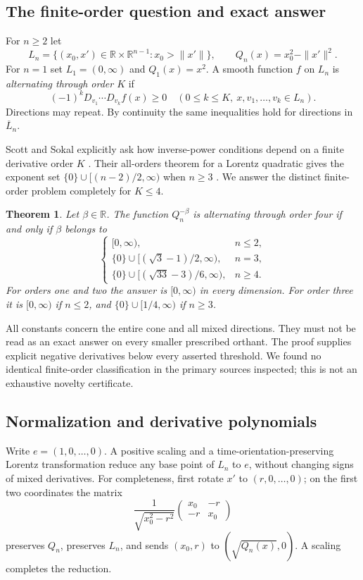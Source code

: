 \documentclass[11pt,a4paper]{article}
\newtheorem{theorem}{Theorem}[section]
\theoremstyle{definition}\newtheorem{definition}[theorem]{Definition}
\theoremstyle{remark}\newtheorem{remark}[theorem]{Remark}
\newcommand{\R}{\mathbb R}\newcommand{\C}{\mathbb C}\newcommand{\N}{\mathbb N}
\numberwithin{equation}{section}
\begin{document}
\subsection{The finite-order question and exact answer}\label{S06-sec-1}
For $n\ge2$ let
\[
 L_n=\{(x_0,x')\in\R\times\R^{n-1}:x_0>\|x'\|\},\qquad
 Q_n(x)=x_0^2-\|x'\|^2.
\]
For $n=1$ set $L_1=(0,\infty)$ and $Q_1(x)=x^2$. A smooth function $f$ on $L_n$ is \emph{alternating through order $K$} if
\begin{equation}\label{S06-alt}
 (-1)^kD_{v_1}\cdots D_{v_k}f(x)\ge0
 \quad(0\le k\le K,\ x,v_1,\ldots,v_k\in L_n).
\end{equation}
Directions may repeat. By continuity the same inequalities hold for directions in $\overline L_n$.

Scott and Sokal explicitly ask how inverse-power conditions depend on a finite derivative order $K$ \cite[Section 1.5]{ref005}. Their all-orders theorem for a Lorentz quadratic gives the exponent set $\{0\}\cup[(n-2)/2,\infty)$ when $n\ge3$ \cite[Theorem 1.9]{ref005}. We answer the distinct finite-order problem completely for $K\le4$.
\begin{theorem}\label{S06-main}
Let $\beta\in\R$. The function $Q_n^{-\beta}$ is alternating through order four if and only if $\beta$ belongs to
\[
\begin{cases}
[0,\infty),&n\le2,\\
\{0\}\cup[(\sqrt3-1)/2,\infty),&n=3,\\
\{0\}\cup[(\sqrt{33}-3)/6,\infty),&n\ge4.
\end{cases}
\]
For orders one and two the answer is $[0,\infty)$ in every dimension. For order three it is $[0,\infty)$ if $n\le2$, and $\{0\}\cup[1/4,\infty)$ if $n\ge3$.
\end{theorem}
All constants concern the entire cone and all mixed directions. They must not be read as an exact answer on every smaller prescribed orthant. The proof supplies explicit negative derivatives below every asserted threshold. We found no identical finite-order classification in the primary sources inspected; this is not an exhaustive novelty certificate.

\subsection{Normalization and derivative polynomials}\label{S06-sec-2}
Write $e=(1,0,\ldots,0)$. A positive scaling and a time-orientation-preserving Lorentz transformation reduce any base point of $L_n$ to $e$, without changing signs of mixed derivatives. For completeness, first rotate $x'$ to $(r,0,\ldots,0)$; on the first two coordinates the matrix
\[
 \frac1{\sqrt{x_0^2-r^2}}
 \begin{pmatrix}x_0&-r\\-r&x_0\end{pmatrix}
\]
preserves $Q_n$, preserves $L_n$, and sends $(x_0,r)$ to $(\sqrt{Q_n(x)},0)$. A scaling completes the reduction.
\end{document}
